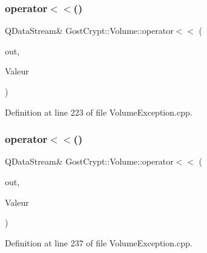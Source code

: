 \subsubsection{\texorpdfstring{operator$<$$<$()}{operator<<()}\hspace{0.1cm}{\footnotesize\ttfamily [16/19]}}
{\footnotesize\ttfamily Q\+Data\+Stream\& Gost\+Crypt\+::\+Volume\+::operator$<$$<$ (\begin{DoxyParamCaption}\item[{Q\+Data\+Stream \&}]{out,  }\item[{const \hyperlink{class_gost_crypt_1_1_volume_1_1_protection_password_or_keyfiles_incorrect}{Gost\+Crypt\+::\+Volume\+::\+Protection\+Password\+Or\+Keyfiles\+Incorrect} \&}]{Valeur }\end{DoxyParamCaption})}



Definition at line 223 of file Volume\+Exception.\+cpp.

\mbox{\label{namespace_gost_crypt_1_1_volume_a29fe87bbbb7434977f4c3afba8f28e0e}} 
\subsubsection{\texorpdfstring{operator$<$$<$()}{operator<<()}\hspace{0.1cm}{\footnotesize\ttfamily [17/19]}}
{\footnotesize\ttfamily Q\+Data\+Stream\& Gost\+Crypt\+::\+Volume\+::operator$<$$<$ (\begin{DoxyParamCaption}\item[{Q\+Data\+Stream \&}]{out,  }\item[{const \hyperlink{class_gost_crypt_1_1_volume_1_1_password_or_keyfiles_incorrect}{Gost\+Crypt\+::\+Volume\+::\+Password\+Or\+Keyfiles\+Incorrect} \&}]{Valeur }\end{DoxyParamCaption})}



Definition at line 237 of file Volume\+Exception.\+cpp.

\mbox{\label{namespace_gost_crypt_1_1_volume_ae1b64208f9f99600dabd5c92df69d1af}} 

